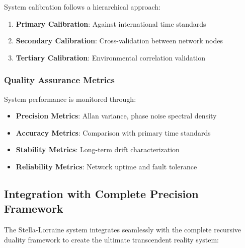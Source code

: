 \documentclass[12pt,a4paper]{article}
\begin{document}
{{{{{{{{{{{{{{System calibration follows a hierarchical approach:

\begin{enumerate}
\item \textbf{Primary Calibration}: Against international time standards
\item \textbf{Secondary Calibration}: Cross-validation between network nodes
\item \textbf{Tertiary Calibration}: Environmental correlation validation
\end{enumerate}

\subsubsection{Quality Assurance Metrics}

System performance is monitored through:

\begin{itemize}
\item \textbf{Precision Metrics}: Allan variance, phase noise spectral density
\item \textbf{Accuracy Metrics}: Comparison with primary time standards
\item \textbf{Stability Metrics}: Long-term drift characterization
\item \textbf{Reliability Metrics}: Network uptime and fault tolerance
\end{itemize}

\subsection{Integration with Complete Precision Framework}

The Stella-Lorraine system integrates seamlessly with the complete recursive duality framework to create the ultimate transcendent reality system:

\begin{figure}[H]
\centering
{}
\end{figure}}}}}}}}}}}}}}}
\end{document}

